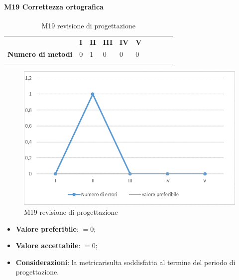 \paragraph{M19 Correttezza ortografica} \mbox{}
\begin{longtable}[H!] {						
		>{}p{50mm}  		
		>{}p{8mm}
		>{}p{8mm}		
		>{}p{8mm}		
		>{}p{8mm}		
		>{}p{8mm}		
		>{}p{8mm}
		>{}p{8mm}
		>{}p{8mm}
		>{}p{8mm}
	}
	\rowcolor{gray!50}
	\textbf{} & \textbf{I} & \textbf{II} & \textbf{III} & \textbf{IV} & \textbf{V} \TBstrut \\ [2mm]
	\textbf{Numero di metodi} & 0 & 1 & 0 & 0 & 0 \TBstrut \\ [2mm]
	\rowcolor{white}
	\caption{M19 revisione di progettazione\glo}
\end{longtable}
\begin{figure}[H] 	
	\includegraphics[width=\linewidth]{./img/grafici/RP17.png}	
	\caption{M19 revisione di progettazione\glo}	
\end{figure}
\begin{itemize}
	\item \textbf{Valore preferibile}: $=0$;
	\item \textbf{Valore accettabile}: $=0$;
	\item \textbf{Considerazioni}: la metrica\glosp risulta soddisfatta al termine del periodo di progettazione\glo.
\end{itemize}

